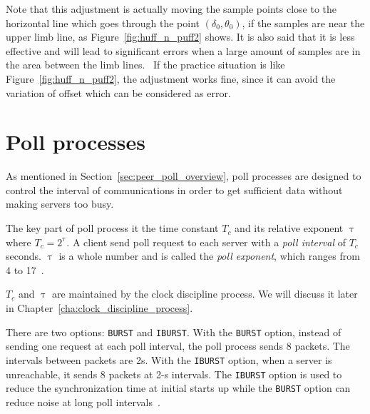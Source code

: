 

Note that this adjustment is actually moving the sample points close to the
horizontal line which goes through the point $(\delta_0, \theta_0)$, if the
samples are near the upper limb line, as Figure~\ref{fig:huff_n_puff2} shows.
It is also said that it is less effective and will lead to significant errors
when a large amount of samples are in the area between the limb
lines.~\cite{huff_n_puff} If the practice situation is like
Figure~\ref{fig:huff_n_puff2}, the adjustment works fine, since it can avoid
the variation of offset which can be considered as error.


\section{Poll processes}%
\label{sec:poll_processes}
As mentioned in Section~\ref{sec:peer_poll_overview}, poll processes are
designed to control the interval of communications in order to get sufficient
data without making servers too busy. 

The key part of poll process it the time constant $T_c$ and its relative 
exponent $\uptau$ where $T_c = 2 ^ {\uptau}$. A client send poll request to
each server with a \emph{poll interval} of $T_c$ seconds. $\uptau$ is a whole
number and is called the \emph{poll exponent}, which ranges from 4 to
17~\cite{rfc5905}.

$T_c$ and $\uptau$ are maintained by the clock discipline process. We will
discuss it later in Chapter~\ref{cha:clock_discipline_process}.

There are two options: \verb|BURST| and \verb|IBURST|. With the \verb|BURST|
option, instead of sending one request at each poll interval, the poll
process sends 8 packets. The intervals between packets are 2s. With the
\verb|IBURST| option, when a server is unreachable, it sends 8 packets at 2-s
intervals. The \verb|IBURST| option is used to reduce the synchronization
time at initial starts up while the \verb|BURST| option can reduce noise at
long poll intervals~\cite{poll_process}.

